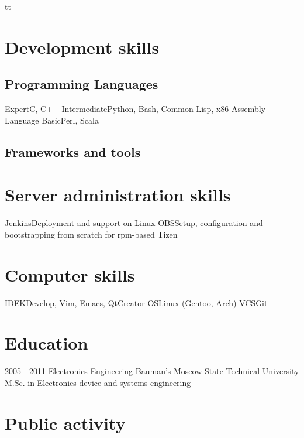 tt\documentclass[11pt,a4paper]{moderncv}
\begin{document}
\section{Development skills}
\subsection{Programming Languages}
\cvitem
  {Expert}{C, C++}
\cvitem
  {Intermediate}{Python, Bash, Common Lisp, x86 Assembly Language}
\cvitem
  {Basic}{Perl, Scala}
\subsection{Frameworks and tools}

\section{Server administration skills}
\cvitem
  {Jenkins}{Deployment and support on Linux}
\cvitem
  {OBS}{Setup, configuration and bootstrapping from scratch for rpm-based Tizen}

\section{Computer skills}
  \cvitem
  {IDE}{KDevelop, Vim, Emacs, QtCreator}
  \cvitem
  {OS}{Linux (Gentoo, Arch)}
  \cvitem
  {VCS}{Git}

\section{Education}
  \cventry
    {2005 - 2011}
    {Electronics Engineering}
    {Bauman's Moscow State Technical University}
    {}{}
    {M.Sc. in Electronics device and systems engineering}

\section{Public activity}
\end{document}
